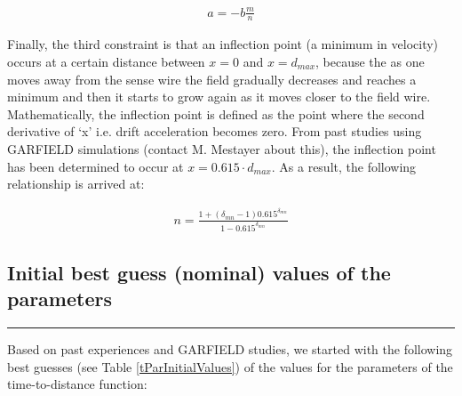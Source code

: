 \documentclass[12pt]{article}
\begin{document}
\begin{equation}
\label{tvsxConstraints2}
\begin{aligned}     
     a = - b \frac{m}{n}
  \end{aligned}
\end{equation}

Finally, the third constraint is that an inflection point (a minimum in velocity) occurs at a certain distance between $x=0$ and $x=d_{max}$, because the as one moves away from the sense wire the field gradually decreases and reaches a minimum and then it starts to grow again as it moves closer to the field wire. Mathematically, the inflection point is defined as the point where the second derivative of `x' i.e. drift acceleration becomes zero. From past studies using GARFIELD simulations (contact M. Mestayer about this), the inflection point has been determined to occur at $x = 0.615\cdot d_{max}$. As a result, the following relationship is arrived at:

\begin{equation}
\label{tvsxConstraints3}
\begin{aligned}     
     n =  \frac{1 + (\delta_{mn} - 1) 0.615^{\delta_{mn}}}{ 1 - 0.615^{\delta_{mn}}}
  \end{aligned}
\end{equation}





\subsection{Initial best guess (nominal) values of the parameters}
{\color{black} \rule{\linewidth}{0.5mm} }

Based on past experiences and GARFIELD studies, we started with the following best guesses (see Table \ref{tParInitialValues}) of the values for the parameters of the time-to-distance function:
\end{document}
